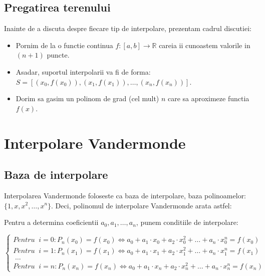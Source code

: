 \documentclass{article}
\begin{document}
\subsection{Pregatirea terenului}
\tab Inainte de a discuta despre fiecare tip de interpolare, prezentam cadrul discutiei: 

\begin{itemize}

    \item Pornim de la o  functie continua $f:[a,b]\rightarrow\mathbb{R}$ careia ii cunoastem valorile in $(n+1)$ puncte.
    
    \item Asadar, suportul interpolarii va fi de forma: $S=[(x_0, f(x_0)), (x_1, f(x_1)),\dots, (x_n, f(x_n))]$.
    
    \item Dorim sa gasim un polinom de grad (cel mult) $n$ care sa aproximeze functia $f(x)$.
    
\end{itemize}


\section{Interpolare Vandermonde}
\label{sec:vandermonde}

\subsection{Baza de interpolare}

\tab Interpolarea Vandermonde foloseste ca baza de interpolare, baza polinoamelor: $\{1, x, x^2,\dots, x^n\}$.\vspace{0.15cm}
\tabto{0.5cm} Deci, polinomul de interpolare Vandermonde arata astfel:
\vspace{0.05cm}

Pentru a determina coeficientii $a_0, a_1, \dots, a_n$, punem conditiile de interpolare: 

\begin{equation*}
    \begin{cases}
      Pentru\;\; i=0: P_n(x_0) = f(x_0) \iff a_0 + a_1\cdot x_0 + a_2\cdot x_0^2 + \dots + a_n\cdot x_0^n = f(x_0)\\
      
      Pentru\;\; i=1: P_n(x_1) = f(x_1) \iff a_0 + a_1\cdot x_1 + a_2\cdot x_1^2 + \dots + a_n\cdot x_1^n = f(x_1)\\
      
      \;\dots\\
      
      Pentru\;\; i=n: P_n(x_n) = f(x_n) \iff a_0 + a_1\cdot x_n + a_2\cdot x_n^2 + \dots + a_n\cdot x_n^n = f(x_n)
    \end{cases}
\end{equation*}
\end{document}
